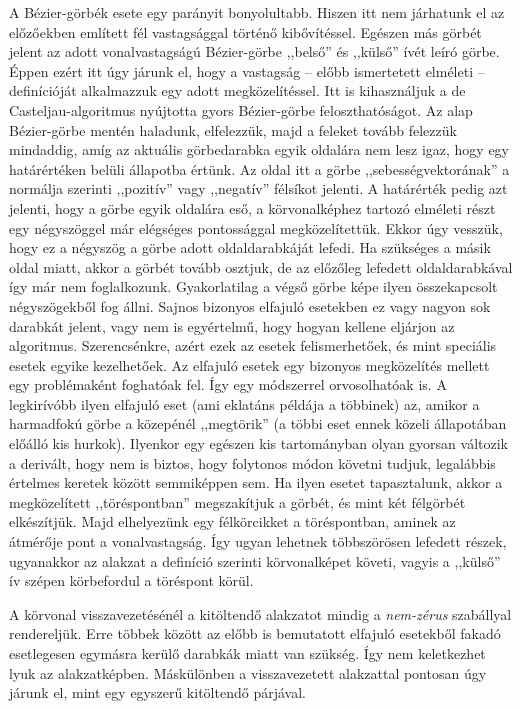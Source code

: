 \documentclass[12pt]{report}
\theoremstyle{definition}
\begin{document}
A Bézier-görbék esete egy parányit bonyolultabb. Hiszen itt nem járhatunk el az
előzőekben említett fél vastagsággal történő kibővítéssel. Egészen más görbét
jelent az adott vonalvastagságú Bézier-görbe ,,belső'' és ,,külső'' ívét leíró
görbe. Éppen ezért itt úgy járunk el, hogy a vastagság -- előbb ismertetett
elméleti -- definícióját alkalmazzuk egy adott megközelítéssel. Itt is
kihasználjuk a de Casteljau-algoritmus nyújtotta gyors Bézier-görbe
feloszthatóságot. Az alap Bézier-görbe mentén haladunk, elfelezzük, majd a
feleket tovább felezzük mindaddig, amíg az aktuális görbedarabka egyik oldalára
nem lesz igaz, hogy egy határértéken belüli állapotba értünk. Az oldal itt a
görbe ,,sebességvektorának'' a normálja szerinti ,,pozitív'' vagy ,,negatív''
félsíkot jelenti. A határérték pedig azt jelenti, hogy a görbe egyik oldalára
eső, a körvonalképhez tartozó elméleti részt egy négyszöggel már elégséges
pontossággal megközelítettük. Ekkor úgy vesszük, hogy ez a négyszög a görbe
adott oldaldarabkáját lefedi. Ha szükséges a másik oldal miatt, akkor a görbét
tovább osztjuk, de az előzőleg lefedett oldaldarabkával így már nem
foglalkozunk. Gyakorlatilag a végső görbe képe ilyen összekapcsolt
négyszögekből fog állni. Sajnos bizonyos elfajuló esetekben ez vagy nagyon sok
darabkát jelent, vagy nem is egyértelmű, hogy hogyan kellene eljárjon az
algoritmus. Szerencsénkre, azért ezek az esetek felismerhetőek, és mint
speciális esetek egyike kezelhetőek. Az elfajuló esetek egy bizonyos
megközelítés mellett egy problémaként foghatóak fel. Így egy módszerrel
orvosolhatóak is. A legkirívóbb ilyen elfajuló eset (ami eklatáns példája a
többinek) az, amikor a harmadfokú görbe a közepénél ,,megtörik'' (a többi eset
ennek közeli állapotában előálló kis hurkok). Ilyenkor egy egészen kis
tartományban olyan gyorsan változik a derivált, hogy nem is biztos, hogy
folytonos módon követni tudjuk, legalábbis értelmes keretek között semmiképpen
sem. Ha ilyen esetet tapasztalunk, akkor a megközelített ,,töréspontban''
megszakítjuk a görbét, és mint két félgörbét elkészítjük. Majd elhelyezünk egy
félkörcikket a töréspontban, aminek az átmérője pont a vonalvastagság. Így ugyan
lehetnek többszörösen lefedett részek, ugyanakkor az alakzat a definíció
szerinti körvonalképet követi, vagyis a ,,külső'' ív szépen körbefordul a
töréspont körül.

A körvonal visszavezetésénél a kitöltendő alakzatot mindig a \emph{nem-zérus}
szabállyal rendereljük. Erre többek között az előbb is bemutatott elfajuló
esetekből fakadó esetlegesen egymásra kerülő darabkák miatt van szükség. Így
nem keletkezhet lyuk az alakzatképben. Máskülönben a visszavezetett
alakzattal pontosan úgy járunk el, mint egy egyszerű kitöltendő párjával.
\end{document}
